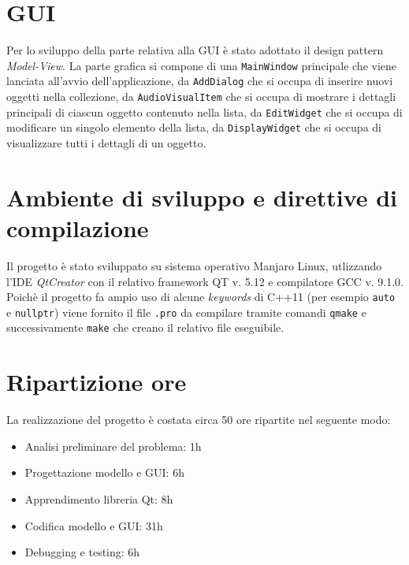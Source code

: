     \section*{GUI}
        Per lo sviluppo della parte relativa alla GUI è stato adottato il design pattern \textit{Model-View}. \newline
        La parte grafica si compone di una \texttt{MainWindow} principale che viene lanciata all'avvio dell'applicazione, da \texttt{AddDialog} che si occupa di inserire nuovi oggetti nella collezione, da \texttt{AudioVisualItem} che si occupa di mostrare i dettagli principali di ciascun oggetto contenuto nella lista, da \texttt{EditWidget} che si occupa di modificare un singolo elemento della lista, da \texttt{DisplayWidget} che si occupa di visualizzare tutti i dettagli di un oggetto. \newline


    \section*{Ambiente di sviluppo e direttive di compilazione}
        Il progetto è stato sviluppato su sistema operativo Manjaro Linux, utlizzando l'IDE \textit{QtCreator} con il relativo framework QT v. 5.12 e compilatore GCC v. 9.1.0. \newline
        Poichè il progetto fa ampio uso di alcune \textit{keywords} di C++11 (per esempio \texttt{auto} e \texttt{nullptr}) viene fornito il file \texttt{.pro} da compilare tramite comandi \texttt{qmake} e successivamente \texttt{make} che creano il relativo file eseguibile.

    \section*{Ripartizione ore}
        La realizzazione del progetto è costata circa 50 ore ripartite nel seguente modo:
        \begin{itemize}
            \item Analisi preliminare del problema: 1h
            \item Progettazione modello e GUI: 6h
            \item Apprendimento libreria Qt: 8h
            \item Codifica modello e GUI: 31h
            \item Debugging e testing: 6h
        \end{itemize}


    


